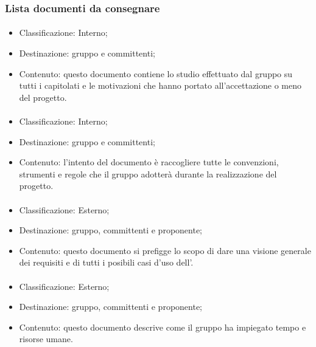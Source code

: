 		\subsubsection{Lista documenti da consegnare}
			\paragraph{\SdF}
				\begin{itemize}
					\item Classificazione: Interno;
					\item Destinazione: gruppo e committenti;
					\item Contenuto: questo documento contiene lo studio effettuato dal gruppo su tutti i capitolati e le motivazioni che hanno portato all’accettazione o meno del progetto.
				\end{itemize}
			\paragraph{\NdP}
			\begin{itemize}
				\item Classificazione: Interno;
				\item Destinazione: gruppo e committenti;
				\item Contenuto: l’intento del documento è raccogliere tutte le convenzioni, strumenti e regole che il gruppo adotterà durante la realizzazione del progetto. 
			\end{itemize}	
			\paragraph{\AdR}
			\begin{itemize}
				\item Classificazione: Esterno;
				\item Destinazione: gruppo, committenti e proponente;
				\item Contenuto: questo documento si prefigge lo scopo di dare una visione generale dei requisiti e di tutti i posibili casi d'uso dell'\progetto.
			\end{itemize}
			\paragraph{\PdP}
				\begin{itemize}
					\item Classificazione: Esterno;
					\item Destinazione: gruppo, committenti e proponente;
					\item Contenuto: questo documento descrive come il gruppo ha impiegato tempo e risorse umane.
				\end{itemize}
